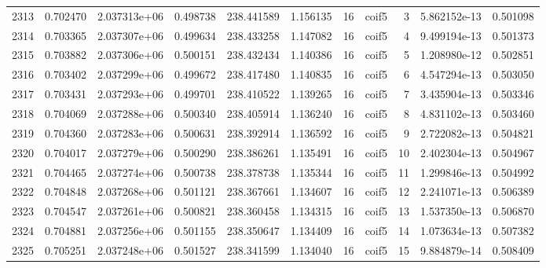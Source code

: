 \begin{tabular}{lrrrrrrlrrr}
2313 &    0.702470 &        2.037313e+06 &  0.498738 &              238.441589 &    1.156135 &      16 &        coif5 &      3 &   5.862152e-13 &      0.501098 \\
2314 &    0.703365 &        2.037307e+06 &  0.499634 &              238.433258 &    1.147082 &      16 &        coif5 &      4 &   9.499194e-13 &      0.501373 \\
2315 &    0.703882 &        2.037306e+06 &  0.500151 &              238.432434 &    1.140386 &      16 &        coif5 &      5 &   1.208980e-12 &      0.502851 \\
2316 &    0.703402 &        2.037299e+06 &  0.499672 &              238.417480 &    1.140835 &      16 &        coif5 &      6 &   4.547294e-13 &      0.503050 \\
2317 &    0.703431 &        2.037293e+06 &  0.499701 &              238.410522 &    1.139265 &      16 &        coif5 &      7 &   3.435904e-13 &      0.503346 \\
2318 &    0.704069 &        2.037288e+06 &  0.500340 &              238.405914 &    1.136240 &      16 &        coif5 &      8 &   4.831102e-13 &      0.503460 \\
2319 &    0.704360 &        2.037283e+06 &  0.500631 &              238.392914 &    1.136592 &      16 &        coif5 &      9 &   2.722082e-13 &      0.504821 \\
2320 &    0.704017 &        2.037279e+06 &  0.500290 &              238.386261 &    1.135491 &      16 &        coif5 &     10 &   2.402304e-13 &      0.504967 \\
2321 &    0.704465 &        2.037274e+06 &  0.500738 &              238.378738 &    1.135344 &      16 &        coif5 &     11 &   1.299846e-13 &      0.504992 \\
2322 &    0.704848 &        2.037268e+06 &  0.501121 &              238.367661 &    1.134607 &      16 &        coif5 &     12 &   2.241071e-13 &      0.506389 \\
2323 &    0.704547 &        2.037261e+06 &  0.500821 &              238.360458 &    1.134315 &      16 &        coif5 &     13 &   1.537350e-13 &      0.506870 \\
2324 &    0.704881 &        2.037256e+06 &  0.501155 &              238.350647 &    1.134409 &      16 &        coif5 &     14 &   1.073634e-13 &      0.507382 \\
2325 &    0.705251 &        2.037248e+06 &  0.501527 &              238.341599 &    1.134040 &      16 &        coif5 &     15 &   9.884879e-14 &      0.508409 \\

\end{tabular}
